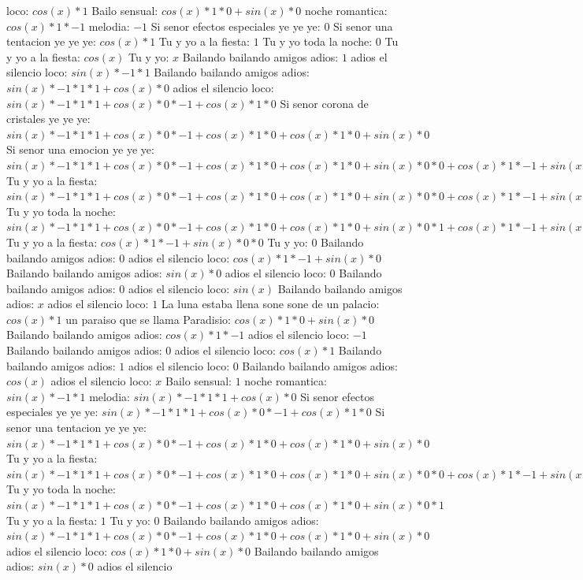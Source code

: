 \documentclass{article}
\begin{document}
loco: $cos(x)*1$ Bailo sensual: $cos(x)*1*0+sin(x)*0$ noche romantica: $cos(x)*1*-1$ melodia: $-1$ Si senor efectos especiales ye ye ye: $0$  \newline Si senor una tentacion ye ye ye: $cos(x)*1$ Tu y yo a la fiesta: $1$ Tu y yo toda la noche: $0$  \newline Tu y yo a la fiesta: $cos(x)$  \newline Tu y yo: $x$ Bailando bailando amigos adios: $1$  \newline adios el silencio loco: $sin(x)*-1*1$ Bailando bailando amigos adios: $sin(x)*-1*1*1+cos(x)*0$ adios el silencio loco: ${sin(x)*-1*1*1+cos(x)*0}*-1+cos(x)*1*0$ Si senor corona de cristales ye ye ye: ${sin(x)*-1*1*1+cos(x)*0}*-1+cos(x)*1*0+cos(x)*1*0+sin(x)*0$ Si senor una emocion ye ye ye: ${{sin(x)*-1*1*1+cos(x)*0}*-1+cos(x)*1*0+cos(x)*1*0+sin(x)*0}*0+{cos(x)*1*-1+sin(x)*0}*0$ Tu y yo a la fiesta: ${{sin(x)*-1*1*1+cos(x)*0}*-1+cos(x)*1*0+cos(x)*1*0+sin(x)*0}*0+{cos(x)*1*-1+sin(x)*0}*0+{cos(x)*1*-1+sin(x)*0}*0+sin(x)*-1*0$ Tu y yo toda la noche: ${{sin(x)*-1*1*1+cos(x)*0}*-1+cos(x)*1*0+cos(x)*1*0+sin(x)*0}*1+{cos(x)*1*-1+sin(x)*0}*0$  \newline Tu y yo a la fiesta: ${cos(x)*1*-1+sin(x)*0}*0$ Tu y yo: $0$ Bailando bailando amigos adios: $0$  \newline adios el silencio loco: $cos(x)*1*-1+sin(x)*0$  \newline Bailando bailando amigos adios: $sin(x)*0$ adios el silencio loco: $0$ Bailando bailando amigos adios: $0$  \newline adios el silencio loco: $sin(x)$  \newline Bailando bailando amigos adios: $x$ adios el silencio loco: $1$  \newline La luna estaba llena sone sone de un palacio: $cos(x)*1$ un paraiso que se llama Paradisio: $cos(x)*1*0+sin(x)*0$ Bailando bailando amigos adios: $cos(x)*1*-1$ adios el silencio loco: $-1$ Bailando bailando amigos adios: $0$  \newline adios el silencio loco: $cos(x)*1$ Bailando bailando amigos adios: $1$ adios el silencio loco: $0$  \newline Bailando bailando amigos adios: $cos(x)$  \newline adios el silencio loco: $x$ Bailo sensual: $1$  \newline noche romantica: $sin(x)*-1*1$ melodia: $sin(x)*-1*1*1+cos(x)*0$ Si senor efectos especiales ye ye ye: ${sin(x)*-1*1*1+cos(x)*0}*-1+cos(x)*1*0$ Si senor una tentacion ye ye ye: ${sin(x)*-1*1*1+cos(x)*0}*-1+cos(x)*1*0+cos(x)*1*0+sin(x)*0$ Tu y yo a la fiesta: ${{sin(x)*-1*1*1+cos(x)*0}*-1+cos(x)*1*0+cos(x)*1*0+sin(x)*0}*0+{cos(x)*1*-1+sin(x)*0}*0$ Tu y yo toda la noche: ${{sin(x)*-1*1*1+cos(x)*0}*-1+cos(x)*1*0+cos(x)*1*0+sin(x)*0}*1$ Tu y yo a la fiesta: $1$ Tu y yo: $0$  \newline Bailando bailando amigos adios: ${sin(x)*-1*1*1+cos(x)*0}*-1+cos(x)*1*0+cos(x)*1*0+sin(x)*0$  \newline adios el silencio loco: $cos(x)*1*0+sin(x)*0$  \newline Bailando bailando amigos adios: $sin(x)*0$ adios el silencio 
\end{document}
